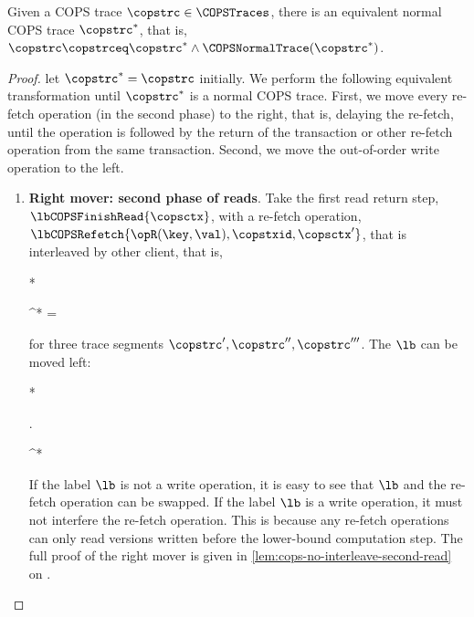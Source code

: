 \begin{theorem}
Given a COPS trace \( \copstrc \in \COPSTraces \),
there is an equivalent normal COPS trace \( \copstrc^* \),
that is, \( \copstrc \copstrceq \copstrc^* \land \COPSNormalTrace(\copstrc^*) \).
\end{theorem}
\begin{proof}
let \( \copstrc^* = \copstrc \) initially.
We perform the following equivalent transformation until \( \copstrc^* \) is a normal COPS trace.
First, we move every re-fetch operation (in the second phase) to the right, that is, delaying the re-fetch,
until the operation is followed by the return of the transaction or other re-fetch operation from the same transaction.
Second, we move the out-of-order write operation to the left.
\begin{enumerate}
\item{\textbf{Right mover: second phase of reads}.} \label{item:cops-second-read}
    Take the first read return step, \( \lbCOPSFinishRead{\copsctx} \),
    with a re-fetch operation, \(\lbCOPSRefetch{\opR(\key,\val), \copstxid, \copsctx' }\),  that 
    is interleaved by other client, that is,
    \begin{Formulae}*
    \begin{Formula}
        \copstrc^* = 
        \land \lb \neq {}
    \end{Formula}
    \end{Formulae}
    for three trace segments \( \copstrc', \copstrc'', \copstrc''' \).
    The \( \lb \) can be moved left:
    \begin{Formulae}*
    \begin{Formula}
        \begin{Bracketed}  .
        \end{Bracketed} \copstrceq \copstrc^*
    \end{Formula}
    \end{Formulae}
    If the label \( \lb \) is not a write operation, 
    it is easy to see that \( \lb \) and the re-fetch operation can be swapped.
    If the label \( \lb \) is a write operation, it must not interfere the re-fetch operation.
    This is because any re-fetch operations can only read versions written before the lower-bound computation step.
    The full proof of the right mover is given in \cref{lem:cops-no-interleave-second-read}
    on \pageref{lem:cops-no-interleave-second-read}.


\end{enumerate}
\end{proof}
